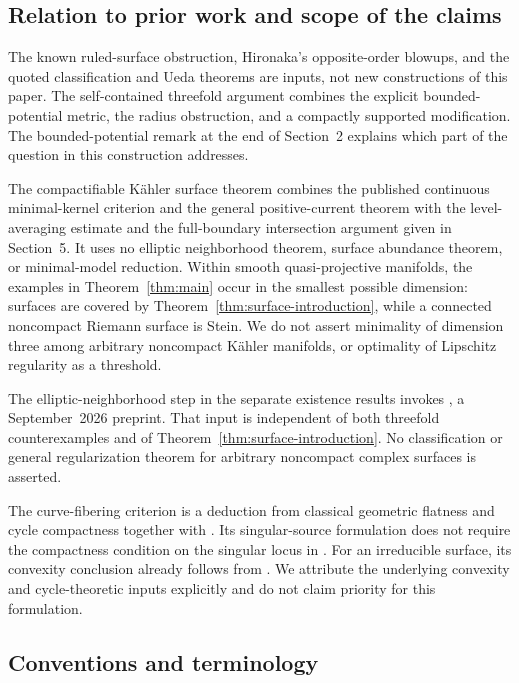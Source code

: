 \documentclass[11pt]{amsart}
\theoremstyle{definition}
\theoremstyle{remark}
\numberwithin{equation}{section}
\begin{document}
\subsection{Relation to prior work and scope of the claims}\label{subsec:provenance}
The known ruled-surface obstruction, Hironaka's opposite-order blowups,
and the quoted classification and Ueda theorems are inputs, not new
constructions of this paper.  The self-contained threefold argument
combines the explicit bounded-potential metric, the radius obstruction,
and a compactly supported modification.  The bounded-potential remark
at the end of Section~2 explains which part of the question in
\cite[Section~4]{Zhang2025} this construction addresses.

The compactifiable K\"ahler surface theorem combines the published
continuous minimal-kernel criterion and the general positive-current
theorem with the level-averaging estimate and the full-boundary
intersection argument given in Section~5.  It uses no elliptic
neighborhood theorem, surface abundance theorem, or minimal-model
reduction.  Within smooth quasi-projective manifolds, the examples
in Theorem~\ref{thm:main} occur in the smallest possible
dimension: surfaces are covered by
Theorem~\ref{thm:surface-introduction}, while a connected
noncompact Riemann surface is Stein.  We do not assert minimality
of dimension three among arbitrary noncompact K\"ahler manifolds,
or optimality of Lipschitz regularity as a threshold.

The elliptic-neighborhood step in the separate existence results
invokes \cite[Theorem~1.6]{CFSTZ2026}, a September~2026 preprint.
That input is independent of both threefold counterexamples and of
Theorem~\ref{thm:surface-introduction}.  No classification or general
regularization theorem for arbitrary noncompact complex surfaces
is asserted.

The curve-fibering criterion is a deduction from classical geometric
flatness and cycle compactness together with
\cite[Corollary~2.5 and Propositions~2.2, 2.4]{VijituForum2022}.
Its singular-source formulation does not require the compactness
condition on the singular locus in \cite[Theorem~1.1]{VijituForum2022}.
For an irreducible surface, its convexity conclusion already follows
from \cite[Theorem~1.1]{Vajaitu2022}.  We attribute the underlying
convexity and cycle-theoretic inputs explicitly and do not claim
priority for this formulation.

\subsection{Conventions and terminology}\label{sec:conventions}
\end{document}
